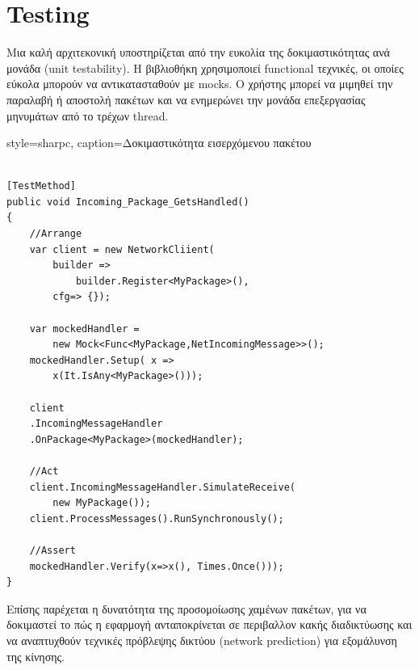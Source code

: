 	\section{Testing}
	Μια καλή αρχιτεκονική υποστηρίζεται από την ευκολία της δοκιμαστικότητας ανά μονάδα (unit testability). Η βιβλιοθήκη χρησιμοποιεί functional τεχνικές, οι οποίες εύκολα μπορούν να αντικατασταθούν με \gls{mocks}. Ο χρήστης μπορεί να μιμηθεί την παραλαβή ή αποστολή πακέτων και να ενημερώνει την μονάδα επεξεργασίας μηνυμάτων από το τρέχων thread.
	
	\lstset
	{
		style=sharpc, 
		caption={Δοκιμαστικότητα εισερχόμενου πακέτου}
	}
	\begin{lstlisting}
	
[TestMethod]
public void Incoming_Package_GetsHandled()
{
	//Arrange
	var client = new NetworkCliient(
		builder => 
			builder.Register<MyPackage>(),
		cfg=> {});
		
	var mockedHandler = 
		new Mock<Func<MyPackage,NetIncomingMessage>>();
	mockedHandler.Setup( x => 
		x(It.IsAny<MyPackage>()));
	
	client
	.IncomingMessageHandler
	.OnPackage<MyPackage>(mockedHandler);	
	
	//Act	
	client.IncomingMessageHandler.SimulateReceive(
		new MyPackage());	
	client.ProcessMessages().RunSynchronously();
	
	//Assert
	mockedHandler.Verify(x=>x(), Times.Once()));
}
	\end{lstlisting}
		
	Επίσης παρέχεται η δυνατότητα της προσομοίωσης χαμένων πακέτων, για να δοκιμαστεί το πώς η εφαρμογή ανταποκρίνεται σε περιβαλλον κακής διαδικτύωσης και να αναπτυχθούν τεχνικές πρόβλεψης δικτύου (network prediction) για εξομάλυνση της κίνησης.
	